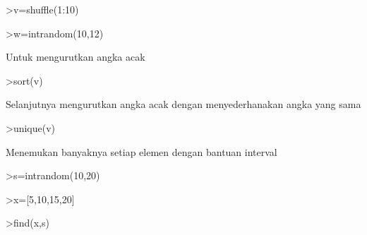 \documentclass[a4paper,10pt]{article}
\begin{document}
\begin{eulernotebook}
\begin{eulercomment}
\begin{eulercomment}
\begin{eulercomment}
\begin{eulercomment}
\begin{eulercomment}
\begin{eulercomment}
\begin{eulercomment}
\end{eulercomment}
\begin{eulerprompt}
>v=shuffle(1:10)
\end{eulerprompt}
\begin{euleroutput}
  [6,  3,  1,  5,  10,  4,  9,  8,  2,  7]
\end{euleroutput}
\begin{eulerprompt}
>w=intrandom(10,12)
\end{eulerprompt}
\begin{euleroutput}
  [11,  4,  9,  3,  6,  4,  11,  3,  6,  2]
\end{euleroutput}
\begin{eulercomment}
Untuk mengurutkan angka acak 
\end{eulercomment}
\begin{eulerprompt}
>sort(v)
\end{eulerprompt}
\begin{euleroutput}
  [1,  2,  3,  4,  5,  6,  7,  8,  9,  10]
\end{euleroutput}
\begin{eulercomment}
Selanjutnya mengurutkan angka acak dengan menyederhanakan angka yang
sama
\end{eulercomment}
\begin{eulerprompt}
>unique(v)
\end{eulerprompt}
\begin{euleroutput}
  [1,  2,  3,  4,  5,  6,  7,  8,  9,  10]
\end{euleroutput}
\begin{eulercomment}
Menemukan banyaknya setiap elemen dengan bantuan interval
\end{eulercomment}
\begin{eulerprompt}
>s=intrandom(10,20)
\end{eulerprompt}
\begin{euleroutput}
  [12,  9,  15,  10,  7,  11,  11,  4,  6,  18]
\end{euleroutput}
\begin{eulerprompt}
>x=[5,10,15,20]
\end{eulerprompt}
\begin{euleroutput}
  [5,  10,  15,  20]
\end{euleroutput}
\begin{eulerprompt}
>find(x,s)
\end{eulerprompt}
\begin{euleroutput}
  [2,  1,  3,  2,  1,  2,  2,  0,  1,  3]
\end{euleroutput}

\end{eulercomment}
\end{eulercomment}
\end{eulercomment}
\end{eulercomment}
\end{eulercomment}
\end{eulercomment}
\end{eulernotebook}
\end{document}
